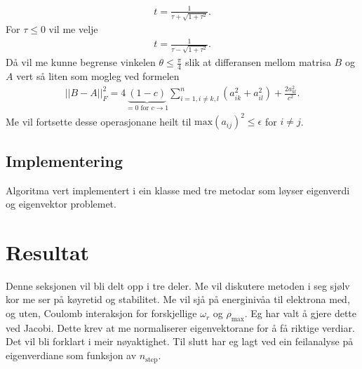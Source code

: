 \documentclass[11pt, a4paper]{article}
\begin{document}
    \begin{align*}
      t = \frac{1}{\tau + \sqrt{1 + \tau^2}}.
    \end{align*}
    For $\tau \leq 0$ vil me velje
    \begin{align*}
      t = \frac{1}{\tau - \sqrt{1 + \tau^2}}.
    \end{align*}
    Då vil me kunne begrense vinkelen $\theta \leq \frac{\pi}{4}$ slik at differansen mellom matrisa $B$ og $A$ vert så liten som mogleg ved formelen
    \begin{align*}
      \lvert\lvert B - A \rvert\rvert_F^2 = 4\underbrace{(1 - c)}_{= 0 \text{ for } c \to 1}\sum_{i = 1, i\ne k, l}^n(a_{ik}^2 + a_{il}^2) + \frac{2a_{kl}^2}{c^2}.
    \end{align*}
    Me vil fortsette desse operasjonane heilt til $\text{max}(a_{ij})^2 \leq \epsilon$ for $i \ne j$.

  \subsection{Implementering}
    Algoritma vert implementert i ein klasse med tre metodar som løyser eigenverdi og eigenvektor problemet.



\section{Resultat}
  Denne seksjonen vil bli delt opp i tre deler. Me vil diskutere metoden i seg sjølv kor me ser på køyretid og stabilitet. %
  Me vil sjå på energinivåa til elektrona med, og uten, Coulomb interaksjon for forskjellige $\omega_r$ og $\rho_{\text{max}}$. Eg har valt å gjere dette 
  ved Jacobi. Dette krev at me normaliserer eigenvektorane for å få riktige verdiar. Det vil bli forklart i meir nøyaktighet. %
  Til slutt har eg lagt ved ein feilanalyse på eigenverdiane som funksjon av $n_{\text{step}}$.
\end{document}
